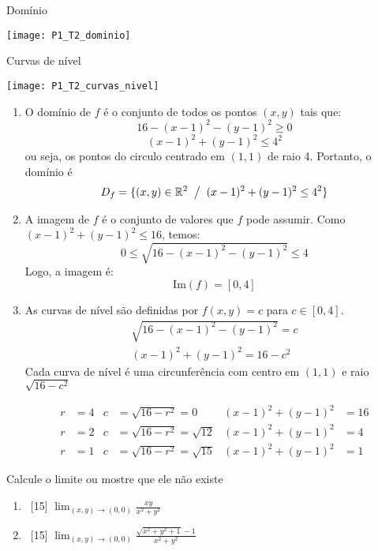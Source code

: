 \documentclass[a4paper,12pt,fleqn]{article}
\begin{document}
\begin{answer}
\begin{multicols}{2}
  Domínio
  \vspace{-0.8\baselineskip}
  \begin{center}
    \texttt{[image: P1\_T2\_dominio]}
  \end{center}
  Curvas de nível
  \vspace{-0.8\baselineskip}
  \begin{center}
    \texttt{[image: P1\_T2\_curvas\_nivel]}
  \end{center}
\end{multicols}

\begin{enumerate}[label=(\alph*)]
\item O domínio de $f$ é o conjunto de todos os pontos \((x, y)\) tais que:
  \[
    16 - (x-1)^2 - (y-1)^2 \geq 0
  \]
  \[
    (x-1)^2 + (y-1)^2 \leq 4^2
  \]
  ou seja, os pontos do circulo centrado em \((1, 1)\) de raio 4.
  Portanto, o domínio é
  \[
    D_f = \{(x, y) \in \mathbb{R}^2 \mathrel{}\big/\mathrel{} (x-1)^2 + (y-1)^2 \leq 4^2\}
  \]

\item A imagem de $f$ é o conjunto de valores que $f$ pode assumir.
  Como \( (x-1)^2 + (y-1)^2 \leq 16 \), temos:
  \[
    0 \leq \sqrt{16 - (x-1)^2 - (y-1)^2} \leq 4
  \]
  Logo, a imagem é:
  \[
    \text{Im}(f) = [0, 4]
  \]

\item As curvas de nível são definidas por $f(x,y) = c$ para $c \in [0, 4]$.
  \begin{gather*}
    \sqrt{16 - (x-1)^2 - (y-1)^2} = c \\
    (x-1)^2 + (y-1)^2 = 16 - c^2
  \end{gather*}
  Cada curva de nível é uma circunferência com
  centro em $(1, 1)$ e raio $\sqrt{16 - c^2}$

  \begin{align*}
    r & = 4 & c & = \sqrt{16 - r^2} = 0         & (x-1)^2 + (y-1)^2 & = 16 \\
    r & = 2 & c & = \sqrt{16 - r^2} = \sqrt{12} & (x-1)^2 + (y-1)^2 & = 4  \\
    r & = 1 & c & = \sqrt{16 - r^2} = \sqrt{15} & (x-1)^2 + (y-1)^2 & = 1
  \end{align*}
\end{enumerate}
\end{answer}

Calcule o limite ou mostre que ele não existe
\begin{enumerate}[label=(\alph*)]
  \item \ [15] \(\lim_{(x,y) \to (0,0)} \frac{xy}{x^2 + y^2}\)
  \item \ [15] \(\lim_{(x,y) \to (0,0)} \frac{\sqrt{x^2 + y^2 + 1} - 1}{x^2 + y^2} \)
\end{enumerate}
\clearpagequestiononly
\end{document}
